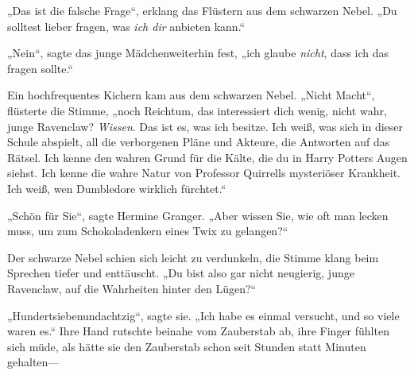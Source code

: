 „Das ist die falsche Frage“, erklang das Flüstern aus dem schwarzen Nebel. „Du solltest lieber fragen, was \emph{ich dir} anbieten kann.“

„Nein“, sagte das junge Mädchenweiterhin fest, „ich glaube \emph{nicht}, dass ich das fragen sollte.“

Ein hochfrequentes Kichern kam aus dem schwarzen Nebel. „Nicht Macht“, flüsterte die Stimme, „noch Reichtum, das interessiert dich wenig, nicht wahr, junge Ravenclaw? \emph{Wissen}. Das ist es, was ich besitze. Ich weiß, was sich in dieser Schule abspielt, all die verborgenen Pläne und Akteure, die Antworten auf das Rätsel. Ich kenne den wahren Grund für die Kälte, die du in Harry Potters Augen siehst. Ich kenne die wahre Natur von Professor Quirrells mysteriöser Krankheit. Ich weiß, wen Dumbledore wirklich fürchtet.“

„Schön für Sie“, sagte Hermine Granger. „Aber wissen Sie, wie oft man lecken muss, um zum Schokoladenkern eines Twix zu gelangen?“

Der schwarze Nebel schien sich leicht zu verdunkeln, die Stimme klang beim Sprechen tiefer und enttäuscht. „Du bist also gar nicht neugierig, junge Ravenclaw, auf die Wahrheiten hinter den Lügen?“

„Hundertsiebenundachtzig“, sagte sie. „Ich habe es einmal versucht, und so viele waren es.“ Ihre Hand rutschte beinahe vom Zauberstab ab, ihre Finger fühlten sich müde, als hätte sie den Zauberstab schon seit Stunden statt Minuten gehalten—


